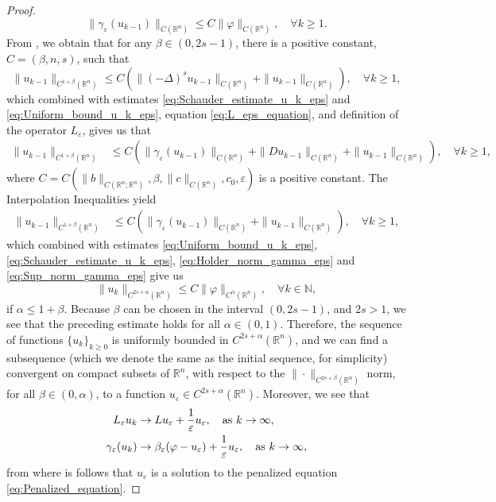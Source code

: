 \documentclass[11pt,reqno]{amsart}
\theoremstyle{definition}
\theoremstyle{remark}
\begin{document}
\begin{proof}
\begin{equation}
\label{eq:Sup_norm_gamma_eps}
\|\gamma_{\varepsilon}(u_{k-1})\|_{C({\mathbb{R}}^n)} \leq C\|\varphi\|_{C({\mathbb{R}}^n)},\quad\forall k \geq 1.
\end{equation}
From \cite[Proposition 2.9]{Silvestre_2007}, we obtain that for any $\beta\in(0,2s-1)$, there is a positive constant, $C=(\beta,n,s)$, such that
$$
\|u_{k-1}\|_{C^{1+\beta}({\mathbb{R}}^n)} \leq C\left(\|(-\Delta)^s u_{k-1}\|_{C({\mathbb{R}}^n)} + \|u_{k-1}\|_{C({\mathbb{R}}^n)}\right),\quad\forall k \geq 1,
$$
which combined with estimates \eqref{eq:Schauder_estimate_u_k_eps} and \eqref{eq:Uniform_bound_u_k_eps}, equation \eqref{eq:L_eps_equation}, and definition of the operator $L_{\varepsilon}$, gives us that
\begin{align*}
\|u_{k-1}\|_{C^{1+\beta}({\mathbb{R}}^n)} &\leq C\left(\|\gamma_{\varepsilon} (u_{k-1})\|_{C({\mathbb{R}}^n)}+\|Du_{k-1}\|_{C({\mathbb{R}}^n)} + \|u_{k-1}\|_{C({\mathbb{R}}^n)}\right),\quad\forall k \geq 1,
\end{align*}
where $C=C(\|b\|_{C({\mathbb{R}}^n;{\mathbb{R}}^n)}, \beta, \|c\|_{C({\mathbb{R}}^n)}, c_0, {\varepsilon})$ is a positive constant. The Interpolation Inequalities \cite[Theorems 8.8.1]{Krylov_LecturesHolder} yield
\begin{align*}
\|u_{k-1}\|_{C^{1+\beta}({\mathbb{R}}^n)} &\leq C\left(\|\gamma_{\varepsilon} (u_{k-1})\|_{C({\mathbb{R}}^n)}+ \|u_{k-1}\|_{C({\mathbb{R}}^n)}\right),\quad\forall k \geq 1,
\end{align*}
which combined with estimates \eqref{eq:Uniform_bound_u_k_eps}, \eqref{eq:Schauder_estimate_u_k_eps}, \eqref{eq:Holder_norm_gamma_eps} and \eqref{eq:Sup_norm_gamma_eps} give us
$$
\|u_k\|_{C^{2s+\alpha}({\mathbb{R}}^n)} \leq C \|\varphi\|_{C^{\alpha}({\mathbb{R}}^n)},\quad\forall k \in {\mathbb{N}},
$$
if $\alpha\leq 1+\beta$. Because $\beta$ can be chosen in the interval $(0,2s-1)$, and $2s>1$, we  see that the preceding estimate holds for all $\alpha\in (0,1)$. Therefore, the sequence of functions $\{u_k\}_{k\geq 0}$ is uniformly bounded in $C^{2s+\alpha}({\mathbb{R}}^n)$, and we can find a subsequence (which we denote the same as the initial sequence, for simplicity) convergent on compact subsets of ${\mathbb{R}}^n$, with respect to the $\|\cdot\|_{C^{2s+\beta}({\mathbb{R}}^n)}$ norm, for all $\beta\in(0,\alpha)$, to a function $u_{\varepsilon} \in C^{2s+\alpha}({\mathbb{R}}^n)$. Moreover, we see that
\begin{align*}
L_{\varepsilon} u_k &\rightarrow Lu_{\varepsilon} + \frac{1}{\varepsilon} u_{\varepsilon},\quad\hbox{as } k \rightarrow \infty,\\
\gamma_{\varepsilon} (u_k) &\rightarrow \beta_{\varepsilon}(\varphi-u_{\varepsilon}) + \frac{1}{\varepsilon} u_{\varepsilon},\quad\hbox{as } k \rightarrow \infty,
\end{align*}
from where is follows that $u_{\varepsilon}$ is a solution to the penalized equation \eqref{eq:Penalized_equation}.
\end{proof}
\end{document}
